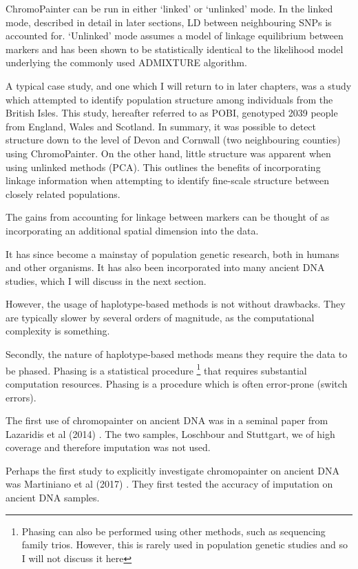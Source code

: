 ChromoPainter can be run in either `linked' or `unlinked' mode. In the linked mode, described in detail in later sections, LD between neighbouring SNPs is accounted for. `Unlinked' mode assumes a model of linkage equilibrium between markers and has been shown to be statistically identical to the likelihood model underlying the commonly used ADMIXTURE algorithm. 

A typical case study, and one which I will return to in later chapters, was a study which attempted to identify population structure among individuals from the British Isles. This study, hereafter referred to as POBI, genotyped 2039 people from England, Wales and Scotland. In summary, it was possible to detect structure down to the level of Devon and Cornwall (two neighbouring counties) using ChromoPainter. On the other hand, little structure was apparent when using unlinked methods (PCA). This outlines the benefits of incorporating linkage information when attempting to identify fine-scale structure between closely related populations.

The gains from accounting for linkage between markers can be thought of as incorporating an additional spatial dimension into the data. 

It has since become a mainstay of population genetic research, both in humans and other organisms. It has also been incorporated into many ancient DNA studies, which I will discuss in the next section. 

However, the usage of haplotype-based methods is not without drawbacks. They are typically slower by several orders of magnitude, as the computational complexity is something. 

Secondly, the nature of haplotype-based methods means they require the data to be phased. Phasing is a statistical procedure \footnote{Phasing can also be performed using other methods, such as sequencing family trios. However, this is rarely used in population genetic studies and so I will not discuss it here} that requires substantial computation resources. Phasing is a procedure which is often error-prone (switch errors).

The first use of chromopainter on ancient DNA was in a seminal paper from Lazaridis et al (2014) \cite{Lazaridis2014}. The two samples, Loschbour and Stuttgart, we of high coverage and therefore imputation was not used.

Perhaps the first study to explicitly investigate chromopainter on ancient DNA was Martiniano et al (2017) \cite{Martiniano2017}. They first tested the accuracy of imputation on ancient DNA samples.


